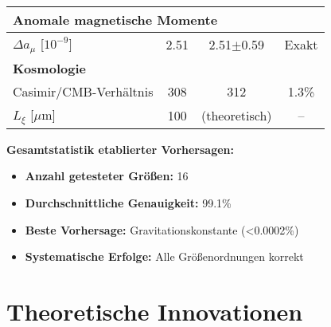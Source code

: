 \documentclass[12pt,a4paper]{article}
\begin{document}
\begin{achievement}
\begin{center}
\begin{longtable}{lccc}
				\multicolumn{4}{l}{\textbf{Anomale magnetische Momente}} \\
				\midrule
				$\Delta a_\mu$ [$10^{-9}$] & 2.51 & 2.51$\pm$0.59 & Exakt \\
				\midrule
				
				\multicolumn{4}{l}{\textbf{Kosmologie}} \\
				\midrule
				Casimir/CMB-Verhältnis & 308 & 312 & 1.3\% \\
				$L_\xi$ [$\mu$m] & 100 & (theoretisch) & -- \\
			\end{longtable}
		\end{center}
		
		\textbf{Gesamtstatistik etablierter Vorhersagen:}
		\begin{itemize}
			\item \textbf{Anzahl getesteter Größen:} 16
			\item \textbf{Durchschnittliche Genauigkeit:} 99.1\%
			\item \textbf{Beste Vorhersage:} Gravitationskonstante (<0.0002\%)
			\item \textbf{Systematische Erfolge:} Alle Größenordnungen korrekt
		\end{itemize}
	\end{achievement}
	
	\section{Theoretische Innovationen}
	
\end{document}
